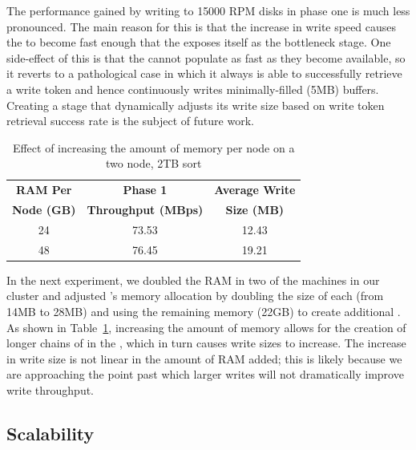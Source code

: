 The performance gained by writing to 15000 RPM disks in phase one is much less
pronounced. The main reason for this is that the increase in write speed causes
the \writers to become fast enough that the \ldts exposes itself as the
bottleneck stage. One side-effect of this is that the
\ldts cannot populate \writerbuffers as fast as they become available, so it
reverts to a pathological case in which it always is able to successfully
retrieve a write token and hence continuously writes minimally-filled (5MB)
buffers. Creating a \ldts stage that dynamically adjusts its write size based
on write token retrieval success rate is the subject of future work.


\begin{table}
\centering
\caption{\label{table:bigmem}Effect of increasing the amount of memory per
  node on a two node, 2TB sort}
\begin{tabular}{|c|c|c|}
\hline
\textbf{RAM Per}  & \textbf{Phase 1}  & \textbf{Average Write} \\
\textbf{Node (GB)} & \textbf{Throughput (MBps)} & \textbf{Size (MB)} \\
\hline
24 & 73.53 & 12.43 \\
48 & 76.45 & 19.21 \\
\hline
\end{tabular}
\end{table}

In the next experiment, we doubled the RAM in two of the machines in our
cluster and adjusted \tritonsort's memory allocation by doubling the size of
each \writerbuffer (from 14MB to 28MB) and using the remaining memory (22GB)
to create additional \ldbuffers. As shown in Table~\ref{table:bigmem},
increasing the amount of memory allows for the creation of longer chains of
\ldbuffers in the \ldts, which in turn causes write sizes to increase. The
increase in write size is not linear in the amount of RAM added; this is likely
because we are approaching the point past which larger writes will not
dramatically improve write throughput.

\subsection{\tritonsort Scalability}


